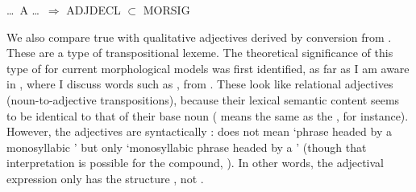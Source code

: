 \documentclass[output=paper,
modfonts
]{LSP/langsci}
\begin{document}
\begin{exe}
\ex
\label{adjmorsig2}

\ldots\ A \ldots\ $\Rightarrow$ ADJDECL $\subset$ MORSIG
\end{exe}


We  also compare true  with qualitative adjectives derived by conversion from . These are a type of transpositional lexeme. The theoretical significance of this type of  for current morphological models was first identified, as far as I am aware in \citet[275]{Spencer13:book}, where I discuss  words such as , from . These look like relational adjectives (noun-to-adjective transpositions), because their lexical semantic content seems to be identical to that of their base noun ( means the same as the  , for instance). However,  the  adjectives are syntactically :  does not mean ‘phrase headed by a monosyllabic ’ but only ‘monosyllabic phrase headed by a ’ (though that interpretation is possible for the compound,  ). In other words, the adjectival expression only has the structure , not .
\end{document}
